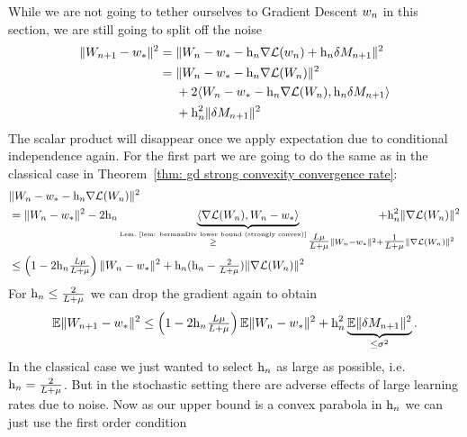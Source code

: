 While we are not going to tether ourselves to Gradient Descent \(w_n\) in
this section, we are still going to split off the noise
\begin{align*}
	\|W_{n+1} - w_*\|^2
	&= \|W_n -w_* - \text{h}_n\nabla\mathcal{L}(w_n) +\text{h}_n \delta M_{n+1}\|^2\\
	&= \begin{aligned}[t]
		&\|W_n - w_* - \text{h}_n\nabla\mathcal{L}(W_n)\|^2\\
		&+ 2\langle W_n - w_* - \text{h}_n\nabla\mathcal{L}(W_n), \text{h}_n \delta M_{n+1}\rangle\\
		&+ \text{h}_n^2 \|\delta M_{n+1}\|^2
	\end{aligned}
\end{align*}
The scalar product will disappear once we apply expectation due to conditional
independence again. For the first part we are going to do the same as in the
classical case in Theorem~\ref{thm: gd strong convexity convergence rate}:
\begin{align}
	\nonumber
	&\|\Weights_n - \minimum - \lr_n\nabla\Loss(\Weights_n)\|^2\\
	\label{eq: getting rid of the scalar product (SGD)}
	&= \|\Weights_n - \minimum\|^2
	- 2\lr_n\underbrace{\langle\nabla\Loss(\Weights_n), \Weights_n-\minimum\rangle}_{
		\xge{\text{Lem.~\ref{lem: bermanDiv lower bound (strongly convex)}}}
	 	\tfrac{\ubound\lbound}{\ubound+\lbound}\|\Weights_n - \minimum\|^2
		\mathrlap{+ \tfrac{1}{\ubound+\lbound}\|\nabla\Loss(\Weights_n)\|^2}
	}
	+ \lr_n^2 \|\nabla\Loss(\Weights_n)\|^2\\
	\nonumber
	&\le \left(1-2\lr_n\tfrac{\ubound\lbound}{\ubound+\lbound}\right)
	\|\Weights_n - \minimum\|^2
	+ \lr_n(\lr_n - \tfrac{2}{\ubound+\lbound})
	\|\nabla\Loss(\Weights_n)\|^2
\end{align}
For \(\text{h}_n\le\tfrac{2}{L+\mu}\) we can drop the gradient again to
obtain
\begin{align*}
	\mathbb{E}\|W_{n+1} - w_*\|^2
	\le \left(1-2\text{h}_n\tfrac{L\mu}{L+\mu}\right)
	\mathbb{E}\|W_n - w_*\|^2 + \text{h}_n^2 \underbrace{\mathbb{E}\|\delta M_{n+1}\|^2}_{\le\sigma^2}.
\end{align*}
In the classical case we just wanted to select \(\text{h}_n\) as large as possible,
i.e. \(\text{h}_n=\tfrac{2}{L+\mu}\). But in the stochastic setting there
are adverse effects of large learning rates due to noise. Now as our upper bound
is a convex parabola in \(\text{h}_n\) we can just use the first order condition
